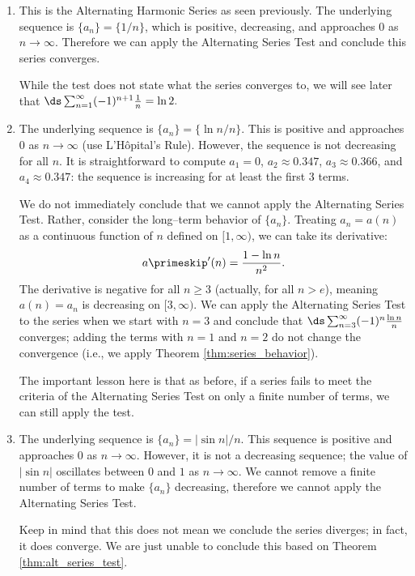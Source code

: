 {\begin{enumerate}
	\item This is the Alternating Harmonic Series as seen previously. The underlying sequence is $\{a_n\} = \{1/n\}$, which is positive, decreasing, and approaches 0 as $n\to\infty$. Therefore we can apply the Alternating Series Test and conclude this series converges. 
	
	While the test does not state what the series converges to, we will see later that $\ds \sum_{n=1}^\infty (-1)^{n+1}\frac1n=\ln2.$
	
	\item		The underlying sequence is $\{a_n\} = \{\ln n/n\}$. This is positive and approaches 0 as $n\to\infty$ (use L'H\^opital's Rule). However, the sequence is not decreasing for all $n$. It is straightforward to compute $a_1=0$, $a_2\approx0.347$, $a_3\approx 0.366$, and $a_4\approx 0.347$: the sequence is increasing for at least the first 3 terms. 
	
	We do not immediately conclude that we cannot apply the Alternating Series Test. Rather, consider the long--term behavior of $\{a_n\}$. Treating $a_n=a(n)$ as a continuous function of $n$ defined on $[1,\infty)$, we can take its derivative:
	$$a\primeskip'(n) = \frac{1-\ln n}{n^2}.$$
	The derivative is negative for all $n\geq 3$ (actually, for all $n>e$), meaning $a(n)=a_n$ is decreasing on $[3,\infty)$. We can apply the Alternating Series Test to the series when we start with $n=3$ and conclude that $\ds \sum_{n=3}^\infty(-1)^n\frac{\ln n}{n}$ converges; adding the terms with $n=1$ and $n=2$ do not change the convergence (i.e., we apply Theorem \ref{thm:series_behavior}).
	
	The important lesson here is that as before, if a series fails to meet the criteria of the Alternating Series Test on only a finite number of terms, we can still apply the test.
	
	\item  The underlying sequence is $\{a_n\} = |\sin n|/n$. This sequence is positive and approaches $0$ as $n\to\infty$. However, it is not a decreasing sequence; the value of $|\sin n|$ oscillates between $0$ and $1$ as $n\to\infty$. We cannot remove a finite number of terms to make $\{a_n\}$ decreasing, therefore we cannot apply the Alternating Series Test.
	
	Keep in mind that this does not mean we conclude the series diverges; in fact, it does converge. We are just unable to conclude this based on Theorem \ref{thm:alt_series_test}.
\end{enumerate}
\baselineskip
}\\

